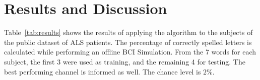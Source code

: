 \documentclass[entropy,article,submit,moreauthors,pdftex,10pt,a4paper]{mdpi}
\begin{document}

\section{Results and Discussion} \label{Results}
\label{section:results}

%

Table~\ref{tab:results} shows the results of applying the algorithm to the subjects of the public dataset of ALS patients. The percentage of correctly spelled letters is calculated while performing an offline BCI Simulation.  From the 7 words for each subject, the first 3 were used as training, and the remaining 4 for testing.  The best performing channel is informed as well. The chance level is $2\%$.  
\end{document}
